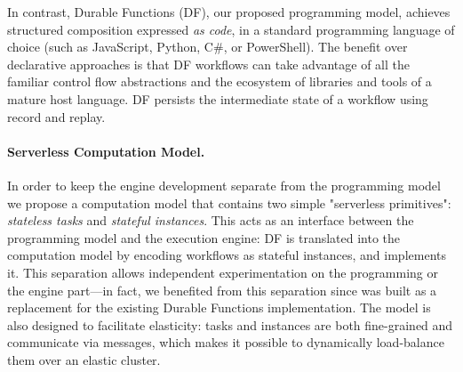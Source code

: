 In contrast, Durable Functions (DF), our proposed programming model, achieves structured composition expressed \emph{as code}, in a standard programming language of choice (such as  JavaScript, Python, C\#, or PowerShell). The benefit over declarative approaches is that DF workflows can take advantage of all the familiar control flow abstractions and the ecosystem of libraries and tools of a mature host language. 
DF persists the intermediate state of a workflow using record and replay.

\paragraph{Serverless Computation Model.}

In order to keep the engine development separate from the programming model we propose a computation model that contains two simple "serverless primitives": \emph{stateless tasks} and \emph{stateful instances}. This acts as an interface between the programming model and the execution engine: DF is translated into the computation model by encoding workflows as stateful instances, and \sys implements it. This separation allows independent experimentation on the programming or the engine part---in fact, we benefited from this separation since \sys was built as a replacement for the existing Durable Functions implementation. The model is also designed to facilitate elasticity: tasks and instances are both fine-grained and communicate via messages, which makes it possible to dynamically load-balance them over an elastic cluster.

